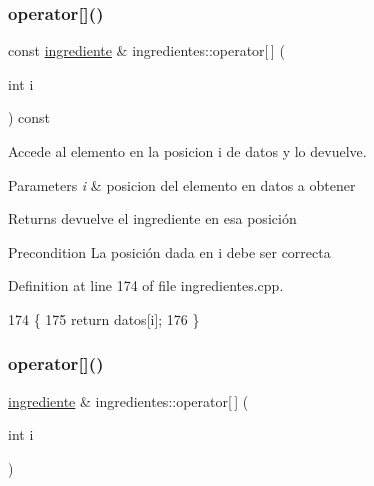 \subsubsection{\texorpdfstring{operator[]()}{operator[]()}\hspace{0.1cm}{\footnotesize\ttfamily [1/2]}}
{\footnotesize\ttfamily const \hyperlink{classingrediente}{ingrediente} \& ingredientes\+::operator\mbox{[}$\,$\mbox{]} (\begin{DoxyParamCaption}\item[{int}]{i }\end{DoxyParamCaption}) const}



Accede al elemento en la posicion i de datos y lo devuelve. 


\begin{DoxyParams}{Parameters}
{\em i} & posicion del elemento en datos a obtener \\
\hline
\end{DoxyParams}
\begin{DoxyReturn}{Returns}
devuelve el ingrediente en esa posición 
\end{DoxyReturn}
\begin{DoxyPrecond}{Precondition}
La posición dada en i debe ser correcta 
\end{DoxyPrecond}


Definition at line 174 of file ingredientes.\+cpp.


\begin{DoxyCode}
174                                                        \{
175     \textcolor{keywordflow}{return} datos[i];
176 \}
\end{DoxyCode}
\mbox{\label{classingredientes_aec207846725fd56da917fc87538e2609}} 
\subsubsection{\texorpdfstring{operator[]()}{operator[]()}\hspace{0.1cm}{\footnotesize\ttfamily [2/2]}}
{\footnotesize\ttfamily \hyperlink{classingrediente}{ingrediente} \& ingredientes\+::operator\mbox{[}$\,$\mbox{]} (\begin{DoxyParamCaption}\item[{int}]{i }\end{DoxyParamCaption})}



